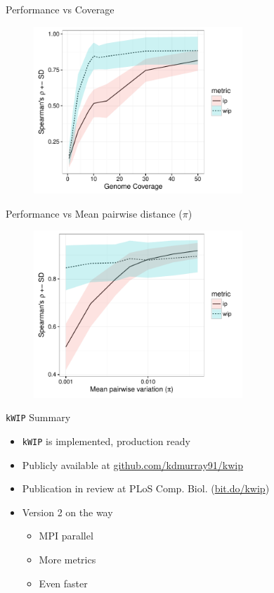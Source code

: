 \documentclass[t]{beamer}
\begin{document}
\begin{frame}{Performance vs Coverage}
  \begin{figure}
    \centering
    \includegraphics[width=0.7\textwidth]{img/coverage-vs-rho_50x.pdf}
  \end{figure}
\end{frame}

\begin{frame}{Performance vs Mean pairwise distance ($\pi$)}
  \begin{figure}
    \centering
    \includegraphics[width=0.7\textwidth]{img/pi-vs-performance.pdf}
  \end{figure}
\end{frame}

\begin{frame}{\texttt{kWIP} Summary}
  \begin{itemize}
    \item \texttt{kWIP} is implemented, production ready
    \item Publicly available at \url{github.com/kdmurray91/kwip}
    \item Publication in review at PLoS Comp. Biol. (\url{bit.do/kwip})
    \item Version 2 on the way
    \begin{itemize}
      \item MPI parallel
      \item More metrics
      \item Even faster
    \end{itemize}
  \end{itemize}
\end{frame}
\end{document}
